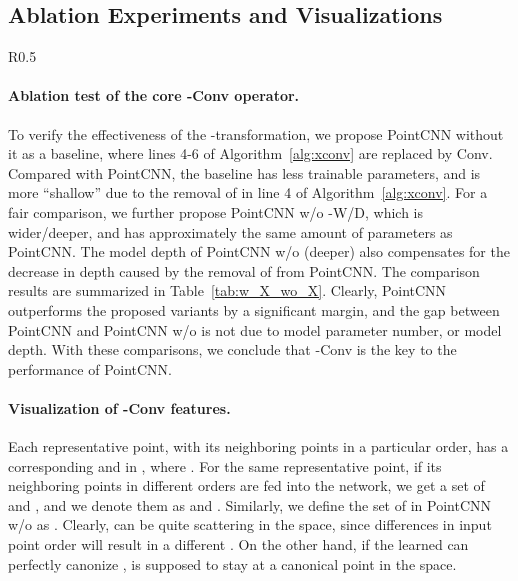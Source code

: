 \documentclass{article}
\begin{document}

\subsection{Ablation Experiments and Visualizations}

\begin{wraptable}{R}{0.5\linewidth}
	\centering
	\caption{Ablation tests on ModelNet40.}
	\label{tab:w_X_wo_X}
\end{wraptable}
\paragraph{Ablation test of the core -Conv operator.} To verify the effectiveness of the -transformation, we propose PointCNN without it as a baseline, where lines 4-6 of Algorithm~\ref{alg:xconv} are replaced by  Conv. Compared with PointCNN, the baseline has less trainable parameters, and is more ``shallow'' due to the removal of  in line 4 of Algorithm~\ref{alg:xconv}. For a fair comparison, we further propose PointCNN w/o -W/D, which is wider/deeper, and has approximately the same amount of parameters as PointCNN. The model depth of PointCNN w/o  (deeper) also compensates for the decrease in depth caused by the removal of  from PointCNN. The comparison results are summarized in Table~\ref{tab:w_X_wo_X}. Clearly, PointCNN outperforms the proposed variants by a significant margin, and the gap between PointCNN and PointCNN w/o  is not due to model parameter number, or model depth. With these comparisons, we conclude that -Conv is the key to the performance of PointCNN.



\paragraph{Visualization of -Conv features.} Each representative point, with its neighboring points in a particular order, has a corresponding  and  in , where . For the same representative point, if its neighboring points in different orders are fed into the network, we get a set of  and , and we denote them as  and . Similarly, we define the set of  in PointCNN w/o  as . Clearly,  can be quite scattering in the  space, since differences in input point order will result in a different . On the other hand, if the learned  can perfectly canonize ,  is supposed to stay at a canonical point in the space.
\end{document}
